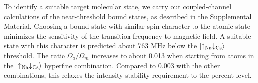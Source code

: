 \documentclass[aps,prl,twocolumn,10pt,superscriptaddress]{revtex4-1}
\newcommand{\Na}{\mathrm{Na}}
\newcommand{\Cs}{\mathrm{Cs}}
\begin{document}
To identify a suitable target molecular state, we carry out coupled-channel calculations of the near-threshold bound states, as described in the Supplemental Material.
Choosing a bound state with similar spin character to the atomic state  minimizes the sensitivity of the transition frequency to magnetic field.
A suitable state with this character is predicted about 763 MHz below the $\ket{\uparrow_{\Na} \downarrow_{\Cs}}$ threshold.
The ratio $\Omega_a/\Omega_m$ increases to about 0.013 when starting from atoms in the $\ket{\uparrow_{\Na} \downarrow_{\Cs}}$ hyperfine combination.
Compared to 0.003
with the other combinations, this relaxes the intensity stability requirement to the percent level. %
\end{document}
